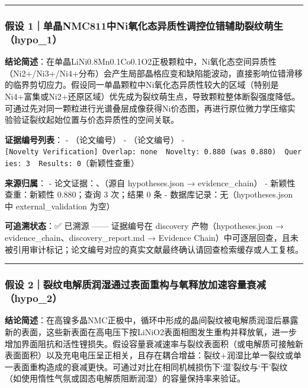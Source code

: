 \documentclass[12pt,a4paper]{ctexart}
\begin{document}
\begin{center}\rule{0.5\linewidth}{0.5pt}\end{center}

\subsubsection{假设 1｜单晶NMC811中Ni氧化态异质性调控位错辅助裂纹萌生（hypo\_1）}\label{ux5047ux8bbe-1ux5355ux6676nmc811ux4e2dniux6c27ux5316ux6001ux5f02ux8d28ux6027ux8c03ux63a7ux4f4dux9519ux8f85ux52a9ux88c2ux7eb9ux840cux751fhypo_1}

\textbf{结论简述}：在单晶LiNi0.8Mn0.1Co0.1O2正极颗粒中，Ni氧化态空间异质性（Ni2+/Ni3+/Ni4+分布）会产生局部晶格应变和缺陷能波动，直接影响位错滑移的临界剪切应力。假设同一单晶颗粒中Ni氧化态异质性较大的区域（特别是Ni4+富集或Ni2+还原区域）优先成为裂纹萌生点，导致颗粒整体断裂强度降低。可通过先对同一颗粒进行光谱叠层成像获得Ni价态图，再进行原位微力学压缩实验验证裂纹起始位置与价态异质性的空间关联。

\textbf{证据编号列表}： - \texttt{\cite{p24}}（论文编号） - \texttt{\cite{p25}}（论文编号） - \texttt{{[}Novelty\ Verification{]}\ Overlap:\ none\ \textbar{}\ Novelty:\ 0.880\ (was\ 0.880)\ \textbar{}\ Queries:\ 3\ \textbar{}\ Results:\ 0}（新颖性查重）

\textbf{来源归属}： - 论文证据：\texttt{\cite{p24}}、\texttt{\cite{p25}}（源自 hypotheses.json → evidence\_chain） - 新颖性查重：新颖性 0.880；查询 3 次；结果 0 条 - 数据库记录：无（hypotheses.json 中 external\_validation 为空）

\textbf{可追溯状态}：✅ 已溯源 ------ 证据编号在 discovery 产物（hypotheses.json → evidence\_chain、discovery\_report.md → Evidence Chain）中可逐层回查，且未被引用审计标记；论文编号对应的真实文献最终确认请回查检索缓存或人工复核。

\begin{center}\rule{0.5\linewidth}{0.5pt}\end{center}

\subsubsection{假设 2｜裂纹电解质润湿通过表面重构与氧释放加速容量衰减（hypo\_2）}\label{ux5047ux8bbe-2ux88c2ux7eb9ux7535ux89e3ux8d28ux6da6ux6e7fux901aux8fc7ux8868ux9762ux91cdux6784ux4e0eux6c27ux91caux653eux52a0ux901fux5bb9ux91cfux8870ux51cfhypo_2}

\textbf{结论简述}：在高镍多晶NMC正极中，循环中形成的晶间裂纹被电解质润湿后暴露新的表面，这些新表面在高电压下按LiNiO2表面相图发生重构并释放氧，进一步增加界面阻抗和活性锂损失。假设容量衰减速率与裂纹表面积（或电解质可接触新表面面积）以及充电电压呈正相关，且存在耦合增益：裂纹+润湿比单一裂纹或单一表面重构造成的衰减更快。可通过对比在相同机械损伤下`湿'裂纹与`干'裂纹（如使用惰性气氛或固态电解质阻断润湿）的容量保持率来验证。
\end{document}
